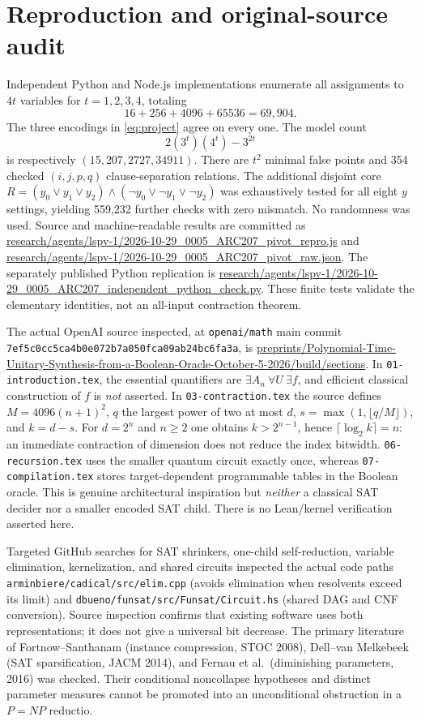 \documentclass[11pt]{article}
\begin{document}
\section{Reproduction and original-source audit}
Independent Python and Node.js implementations enumerate all assignments to $4t$ variables for $t=1,2,3,4$, totaling
\[
16+256+4096+65536=69{,}904.
\]
The three encodings in \eqref{eq:project} agree on every one. The model count
\[
 2(3^t)(4^t)-3^{2t}
\]
is respectively $(15,207,2727,34911)$. There are $t^2$ minimal false points and 354 checked $(i,j,p,q)$ clause-separation relations. The additional disjoint core
$R=(y_0\vee y_1\vee y_2)\land(\neg y_0\vee\neg y_1\vee\neg y_2)$
was exhaustively tested for all eight $y$ settings, yielding 559,232 further checks with zero mismatch. No randomness was used. Source and machine-readable results are committed as
\url{research/agents/lspv-1/2026-10-29_0005_ARC207_pivot_repro.js} and
\url{research/agents/lspv-1/2026-10-29_0005_ARC207_pivot_raw.json}.
The separately published Python replication is \url{research/agents/lspv-1/2026-10-29_0005_ARC207_independent_python_check.py}. These finite tests validate the elementary identities, not an all-input contraction theorem.

The actual OpenAI source inspected, at \texttt{openai/math} main commit \texttt{7ef5c0cc5ca4b0e072b7a050fca09ab24bc6fa3a}, is
\url{preprints/Polynomial-Time-Unitary-Synthesis-from-a-Boolean-Oracle-October-5-2026/build/sections}.
In \texttt{01-introduction.tex}, the essential quantifiers are $\exists A_n\ \forall U\ \exists f$, and efficient classical construction of $f$ is \emph{not} asserted. In \texttt{03-contraction.tex} the source defines $M=4096(n+1)^2$, $q$ the largest power of two at most $d$, $s=\max(1,\lfloor q/M\rfloor)$, and $k=d-s$. For $d=2^n$ and $n\ge2$ one obtains $k>2^{n-1}$, hence $\lceil\log_2 k\rceil=n$: an immediate contraction of dimension does not reduce the index bitwidth. \texttt{06-recursion.tex} uses the smaller quantum circuit exactly once, whereas \texttt{07-compilation.tex} stores target-dependent programmable tables in the Boolean oracle. This is genuine architectural inspiration but \emph{neither} a classical SAT decider nor a smaller encoded SAT child. There is no Lean/kernel verification asserted here.

Targeted GitHub searches for SAT shrinkers, one-child self-reduction, variable elimination, kernelization, and shared circuits inspected the actual code paths \texttt{arminbiere/cadical/src/elim.cpp} (avoids elimination when resolvents exceed its limit) and \texttt{dbueno/funsat/src/Funsat/Circuit.hs} (shared DAG and CNF conversion). Source inspection confirms that existing software uses both representations; it does not give a universal bit decrease. The primary literature of Fortnow--Santhanam (instance compression, STOC 2008), Dell--van Melkebeek (SAT sparsification, JACM 2014), and Fernau et al.\ (diminishing parameters, 2016) was checked. Their conditional noncollapse hypotheses and distinct parameter measures cannot be promoted into an unconditional obstruction in a $P=NP$ reductio.
\end{document}
